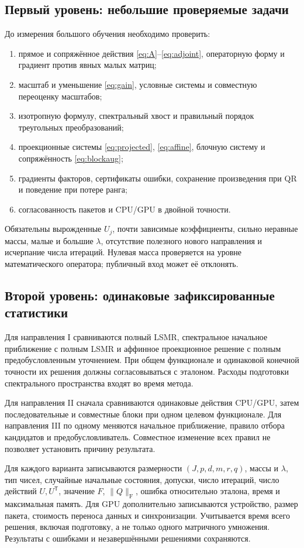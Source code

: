 \documentclass[11pt,a4paper]{article}
\numberwithin{equation}{section}
\theoremstyle{remark}
\newcommand{\T}{^{\mathsf T}}
\newcommand{\F}{_{\mathrm F}}
\begin{document}
\subsection{Первый уровень: небольшие проверяемые задачи}
До измерения большого обучения необходимо проверить:
\begin{enumerate}
 \item прямое и сопряжённое действия \eqref{eq:A}--\eqref{eq:adjoint},
 операторную форму и градиент против явных малых матриц;
 \item масштаб и уменьшение \eqref{eq:gain}, условные системы и
 совместную переоценку масштабов;
 \item изотропную формулу, спектральный хвост и правильный порядок
 треугольных преобразований;
 \item проекционные системы \eqref{eq:projected}, \eqref{eq:affine},
 блочную систему и сопряжённость \eqref{eq:blockaug};
 \item градиенты факторов, сертификаты ошибки, сохранение произведения
 при QR и поведение при потере ранга;
 \item согласованность пакетов и CPU/GPU в двойной точности.
\end{enumerate}
Обязательны вырожденные $U_j$, почти зависимые коэффициенты, сильно
неравные массы, малые и большие $\lambda$, отсутствие полезного нового
направления и исчерпание числа итераций. Нулевая масса проверяется
на уровне математического оператора; публичный вход может её отклонять.

\subsection{Второй уровень: одинаковые зафиксированные статистики}
Для направления I сравниваются полный LSMR, спектральное начальное
приближение с полным LSMR и аффинное проекционное решение с полным
предобусловленным уточнением. При общем функционале и одинаковой конечной
точности их решения должны согласовываться с эталоном.
Расходы подготовки спектрального пространства входят во время метода.

Для направления II сначала сравниваются одинаковые действия CPU/GPU,
затем последовательные и совместные блоки при одном целевом функционале.
Для направления III по одному меняются начальное приближение, правило отбора
кандидатов и предобусловливатель. Совместное изменение всех правил
не позволяет установить причину результата.

Для каждого варианта записываются размерности $(J,p,d,m,r,q)$,
массы и $\lambda$, тип чисел, случайные начальные состояния, допуски,
число итераций, число действий $U,U\T$, значение $F$, $\|Q\|\F$,
ошибка относительно эталона, время и максимальная память.
Для GPU дополнительно записываются устройство, размер пакета, стоимость
переноса данных и синхронизации. Учитывается время всего решения,
включая подготовку, а не только одного матричного умножения.
Результаты с ошибками и незавершёнными решениями сохраняются.
\end{document}
